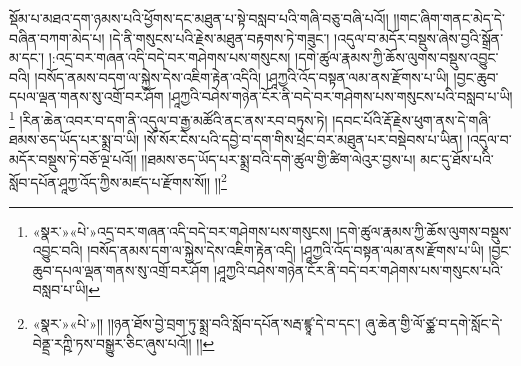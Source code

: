 སྡོམ་པ་མཐའ་དག་ཉམས་པའི་ཕྱོགས་དང་མཐུན་པ་སྟེ་བསླབ་པའི་གཞི་བཅུ་བཞི་པའོ།། །།གང་ཞིག་གནང་མེད་དེ་བཞིན་བཀག་མེད་པ། །དེ་ནི་གསུངས་པའི་རྗེས་མཐུན་བརྟགས་ཏེ་གཟུང་། །འདུལ་བ་མདོར་བསྡུས་ཞེས་བྱའི་སྒྲོན་མ་དང་། །:འདྲ་བར་གཞན་འདི་བདེ་བར་གཤེགས་པས་གསུངས། །དགེ་ཚུལ་རྣམས་ཀྱི་ཆོས་ལུགས་བསྡུས་འབྱུང་བའི། །བསོད་ནམས་བདག་ལ་སྐྱེས་དེས་འཇིག་རྟེན་འདིའི། །ཤཱཀྱའི་འོད་བསྟན་ལམ་ནས་རྫོགས་པ་ཡི། །བྱང་ཆུབ་དཔལ་ལྡན་གནས་སུ་འགྲོ་བར་ཤོག །ཤཱཀྱའི་བཤེས་གཉེན་ངོར་ནི་བདེ་བར་གཤེགས་པས་གསུངས་པའི་བསླབ་པ་ཡི།\footnote{«སྣར་»«པེ་»འདྲ་བར་གཞན་འདི་བདེ་བར་གཤེགས་པས་གསུངས། །དགེ་ཚུལ་རྣམས་ཀྱི་ཆོས་ལུགས་བསྡུས་འབྱུང་བའི། །བསོད་ནམས་དག་ལ་སྐྱེས་དེས་འཇིག་རྟེན་འདི། །ཤཱཀྱའི་འོད་བསྟན་ལམ་ནས་རྫོགས་པ་ཡི། །བྱང་ཆུབ་དཔལ་ལྡན་གནས་སུ་འགྲོ་བར་ཤོག །ཤཱཀྱའི་བཤེས་གཉེན་ངོར་ནི་བདེ་བར་གཤེགས་པས་གསུངས་པའི་བསླབ་པ་ཡི།} །རིན་ཆེན་འབར་བ་དག་ནི་འདུལ་བ་རྒྱ་མཚོའི་ནང་ནས་རབ་བཏུས་ཏེ། །དབང་པོའི་རྡོ་རྗེས་ཕུག་ནས་དེ་གཞི་ཐམས་ཅད་ཡོད་པར་སྨྲ་བ་ཡི། །སོ་སོར་ངེས་པའི་དབྱེ་བ་དག་གིས་ཕྲེང་བར་མཐུན་པར་བསྡེབས་པ་ཡིན། །འདུལ་བ་མདོར་བསྡུས་ཏེ་བཅོ་ལྔ་པའོ།། །།ཐམས་ཅད་ཡོད་པར་སྨྲ་བའི་དགེ་ཚུལ་གྱི་ཚིག་ལེའུར་བྱས་པ། མང་དུ་ཐོས་པའི་སློབ་དཔོན་ཤཱཀྱ་འོད་ཀྱིས་མཛད་པ་རྫོགས་སོ།། །།\footnote{«སྣར་»«པེ་»།། །།ཉན་ཐོས་བྱེ་བྲག་ཏུ་སྨྲ་བའི་སློབ་དཔོན་སརྦ་ཛྙཱ་དེ་བ་དང་། ཞུ་ཆེན་གྱི་ལོ་ཙྪ་བ་དགེ་སློང་དེ་བེནྡྲ་རཀྵི་ཏས་བསྒྱུར་ཅིང་ཞུས་པའོ།། །།}